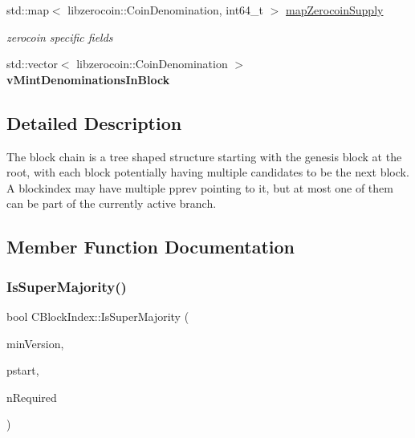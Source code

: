 \begin{DoxyCompactItemize}
std\+::map$<$ libzerocoin\+::\+Coin\+Denomination, int64\+\_\+t $>$ \mbox{\hyperlink{class_c_block_index_a0a25aebf3adf907ea8847e7a108d8225}{map\+Zerocoin\+Supply}}
\begin{DoxyCompactList}\small\item\em zerocoin specific fields \end{DoxyCompactList}\item 
\mbox{\label{class_c_block_index_a7337ba7a13a51b7f200b352caf074eb1}} 
std\+::vector$<$ libzerocoin\+::\+Coin\+Denomination $>$ {\bfseries v\+Mint\+Denominations\+In\+Block}
\end{DoxyCompactItemize}


\subsection{Detailed Description}
The block chain is a tree shaped structure starting with the genesis block at the root, with each block potentially having multiple candidates to be the next block. A blockindex may have multiple pprev pointing to it, but at most one of them can be part of the currently active branch. 

\subsection{Member Function Documentation}
\mbox{\label{class_c_block_index_a96fbd9608432d92c27d4314f32341988}} 
\subsubsection{\texorpdfstring{Is\+Super\+Majority()}{IsSuperMajority()}}
{\footnotesize\ttfamily bool C\+Block\+Index\+::\+Is\+Super\+Majority (\begin{DoxyParamCaption}\item[{int}]{min\+Version,  }\item[{const \mbox{\hyperlink{class_c_block_index}{C\+Block\+Index}} $\ast$}]{pstart,  }\item[{unsigned int}]{n\+Required }\end{DoxyParamCaption})\hspace{0.3cm}{\ttfamily [static]}}


